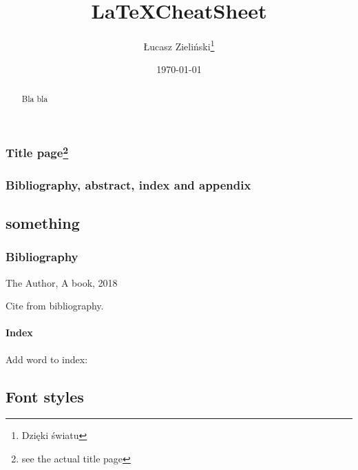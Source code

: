 \documentclass[11pt,a4paper]{report}
\begin{document}
{\subsection[Title page]{Title page\footnote{see the actual title page}}
\begin{latex}
\title{\LaTeX CheatSheet}
\author{Łucasz Zieliński\thanks{Dzięki światu}}
\date{\today}

\begin{titlepage} 
  \maketitle 
\end{titlepage}
\end{latex}


\subsection{Bibliography, abstract, index and appendix}
\begin{latex}
\appendix
\chapter{something}

\begin{abstract}
Bla bla
\end{abstract}
\end{latex}
\subsection{Bibliography}
\begin{latex}
\begin{thebibliography}{99}
     The Author, A book, 2018
\end{thebibliography}
\end{latex}
Cite from bibliography\cite{datta/17}.

\subsubsection{Index}
\begin{latex}
\makeindex
{} %
\printindex
\end{latex}

Add word to index: 

\section{Font styles}
}
\end{document}
